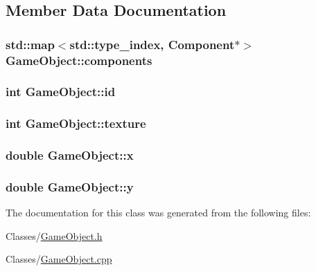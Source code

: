\subsection{Member Data Documentation}
\hypertarget{classGameObject_a665551395d1403714708bedd897cc9a3}{
\subsubsection[{components}]{\setlength{\rightskip}{0pt plus 5cm}std\-::map$<$std\-::type\-\_\-index, {\bf Component}$\ast$$>$ Game\-Object\-::components}}\label{classGameObject_a665551395d1403714708bedd897cc9a3}
\hypertarget{classGameObject_a98291c60da12d9036e1ad24cfebcf6b3}{
\subsubsection[{id}]{\setlength{\rightskip}{0pt plus 5cm}int Game\-Object\-::id}}\label{classGameObject_a98291c60da12d9036e1ad24cfebcf6b3}
\hypertarget{classGameObject_a1d4d998891f953e4a4f15d7372a0d9e3}{
\subsubsection[{texture}]{\setlength{\rightskip}{0pt plus 5cm}int Game\-Object\-::texture}}\label{classGameObject_a1d4d998891f953e4a4f15d7372a0d9e3}
\hypertarget{classGameObject_a77ae10ff022a6cfe7419d4acdcffe2a4}{
\subsubsection[{x}]{\setlength{\rightskip}{0pt plus 5cm}double Game\-Object\-::x}}\label{classGameObject_a77ae10ff022a6cfe7419d4acdcffe2a4}
\hypertarget{classGameObject_af3f4a42c92fa6f6ac04d57bf4b11d43f}{
\subsubsection[{y}]{\setlength{\rightskip}{0pt plus 5cm}double Game\-Object\-::y}}\label{classGameObject_af3f4a42c92fa6f6ac04d57bf4b11d43f}


The documentation for this class was generated from the following files\-:\begin{DoxyCompactItemize}
\item 
Classes/\hyperlink{GameObject_8h}{Game\-Object.\-h}\item 
Classes/\hyperlink{GameObject_8cpp}{Game\-Object.\-cpp}\end{DoxyCompactItemize}
